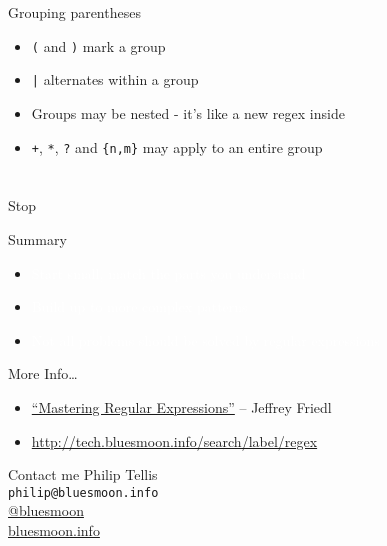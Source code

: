 \documentclass{beamer}
\begin{document}
\begin{frame}{Grouping parentheses}
  \begin{itemize}
  \item \texttt{(} and \texttt{)} mark a group 
  \item \texttt{|} alternates within a group
  \item Groups may be nested - it's like a new regex inside
  \item \texttt{+}, \texttt{*}, \texttt{?} and \texttt{\{n,m\}} may apply to an entire group
  \end{itemize}
\end{frame}

\section*{}

\begin{frame}{Stop}
\end{frame}

\begin{frame}{Summary}

  \begin{itemize}
  \item \textcolor{white}{Start small, match the parts you understand}
  \item \textcolor{white}{Build up to more complex patterns}
  \item \textcolor{white}{Not all problems should be solved by regular expressions}
  \end{itemize}
  
\end{frame}

\begin{frame}{More Info\ldots}
  \begin{itemize}
  \item \href{http://regex.info/}{``Mastering Regular Expressions''} -- Jeffrey Friedl
  \item \small{\url{http://tech.bluesmoon.info/search/label/regex}}
  \end{itemize}
\end{frame}

\begin{frame}{Contact me}
  Philip Tellis \\
  \texttt{philip@bluesmoon.info}\\
  \href{http://twitter.com/bluesmoon}{@bluesmoon} \\
  \href{http://bluesmoon.info/}{bluesmoon.info}
\end{frame}
\end{document}
